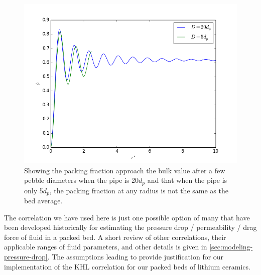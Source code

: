 \begin{figure}[htbp]
\centering
	\includegraphics[width = \singleimagewidth]{figures/annular-packing-fraction.png}
	\caption{Showing the packing fraction approach the bulk value after a few pebble diameters when the pipe is 20$d_p$ and that when the pipe is only 5$d_p$, the packing fraction at any radius is not the same as the bed average.}
	\label{fig:packingDist}
\end{figure}

The correlation we have used here is just one possible option of many that have been developed historically for estimating the pressure drop / permeability / drag force of fluid in a packed bed. A short review of other correlations, their applicable ranges of fluid parameters, and other details is given in \cref{sec:modeling-pressure-drop}. The assumptions leading to  provide justification for our implementation of the KHL correlation for our packed beds of lithium ceramics.
\FloatBarrier



